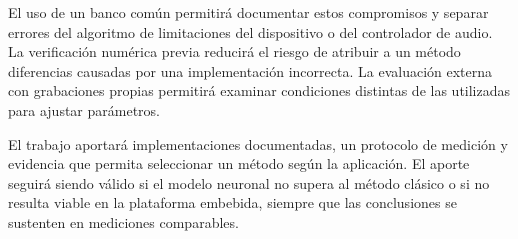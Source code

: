El uso de un banco común permitirá documentar estos compromisos y separar errores del algoritmo de limitaciones del dispositivo o del controlador de audio. La verificación numérica previa reducirá el riesgo de atribuir a un método diferencias causadas por una implementación incorrecta. La evaluación externa con grabaciones propias permitirá examinar condiciones distintas de las utilizadas para ajustar parámetros.

El trabajo aportará implementaciones documentadas, un protocolo de medición y evidencia que permita seleccionar un método según la aplicación. El aporte seguirá siendo válido si el modelo neuronal no supera al método clásico o si no resulta viable en la plataforma embebida, siempre que las conclusiones se sustenten en mediciones comparables.
